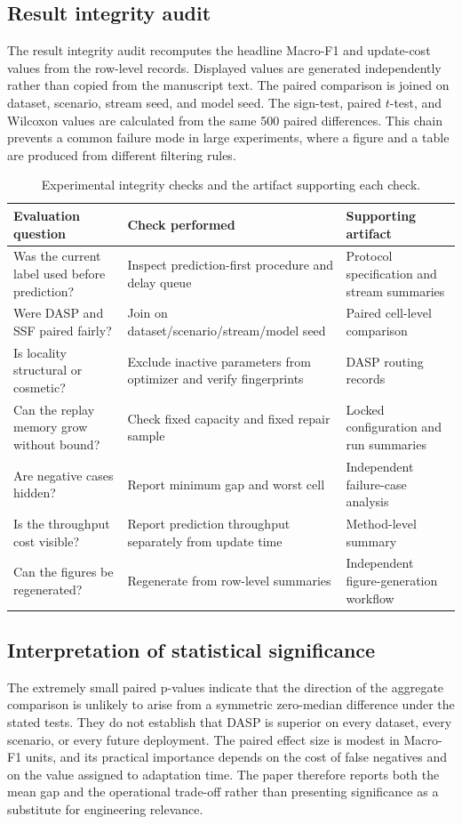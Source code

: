 \subsection{Result integrity audit}
The result integrity audit recomputes the headline Macro-F1 and update-cost values from the row-level records. Displayed values are generated independently rather than copied from the manuscript text. The paired comparison is joined on dataset, scenario, stream seed, and model seed. The sign-test, paired $t$-test, and Wilcoxon values are calculated from the same 500 paired differences. This chain prevents a common failure mode in large experiments, where a figure and a table are produced from different filtering rules.

\begin{table}[t]
\caption{Experimental integrity checks and the artifact supporting each check.}
\label{tab:qa-checks}
\centering
\scriptsize
\begin{tabular}{p{}p{}p{}}
\toprule
Evaluation question & Check performed & Supporting artifact\\
\midrule
Was the current label used before prediction? & Inspect prediction-first procedure and delay queue & Protocol specification and stream summaries\\
Were DASP and SSF paired fairly? & Join on dataset/scenario/stream/model seed & Paired cell-level comparison\\
Is locality structural or cosmetic? & Exclude inactive parameters from optimizer and verify fingerprints & DASP routing records\\
Can the replay memory grow without bound? & Check fixed capacity and fixed repair sample & Locked configuration and run summaries\\
Are negative cases hidden? & Report minimum gap and worst cell & Independent failure-case analysis\\
Is the throughput cost visible? & Report prediction throughput separately from update time & Method-level summary\\
Can the figures be regenerated? & Regenerate from row-level summaries & Independent figure-generation workflow\\
\bottomrule
\end{tabular}
\end{table}

\subsection{Interpretation of statistical significance}
The extremely small paired p-values indicate that the direction of the aggregate comparison is unlikely to arise from a symmetric zero-median difference under the stated tests. They do not establish that DASP is superior on every dataset, every scenario, or every future deployment. The paired effect size is modest in Macro-F1 units, and its practical importance depends on the cost of false negatives and on the value assigned to adaptation time. The paper therefore reports both the mean gap and the operational trade-off rather than presenting significance as a substitute for engineering relevance.

